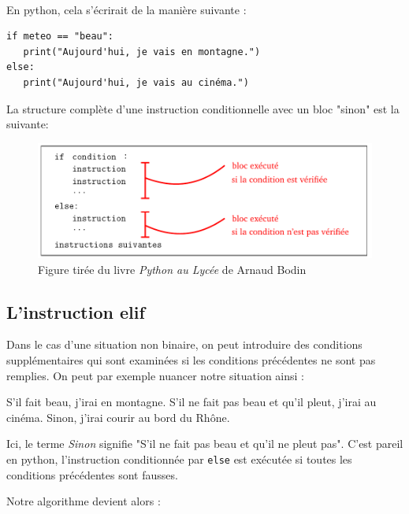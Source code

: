\paragraph{}
En python, cela s'écrirait de la manière suivante :

\begin{lstlisting}[numbers=none]
if meteo == "beau":
   print("Aujourd'hui, je vais en montagne.")
else:
   print("Aujourd'hui, je vais au cinéma.")
\end{lstlisting}

La structure complète d'une instruction conditionnelle avec un bloc "sinon" est la suivante:
\begin{figure}[h!]
	\centering
	\includegraphics[width=0.7\linewidth]{Images/test/if_else_structure}
	\caption{Figure tirée du livre \textit{Python au Lycée} de Arnaud Bodin}
	\label{fig:ifelsestructure}
\end{figure}

\newpage
\subsection{L'instruction \textsf{elif}}
Dans le cas d'une situation non binaire, on peut introduire des conditions supplémentaires qui sont examinées si les conditions précédentes ne sont pas remplies. On peut par exemple nuancer notre situation ainsi : 

\begin{myexample} 
	S'il fait beau, j'irai en montagne. S'il ne fait pas beau et qu'il pleut, j'irai au cinéma. Sinon, j'irai courir au bord du Rhône. 
\end{myexample}

\begin{myremarque} 
	Ici, le terme \textit{Sinon} signifie "S'il ne fait pas beau et qu'il ne pleut pas". C'est pareil en python, l'instruction conditionnée par \lstinline{else} est exécutée si toutes les conditions précédentes sont fausses.
\end{myremarque}


Notre algorithme devient alors : 

